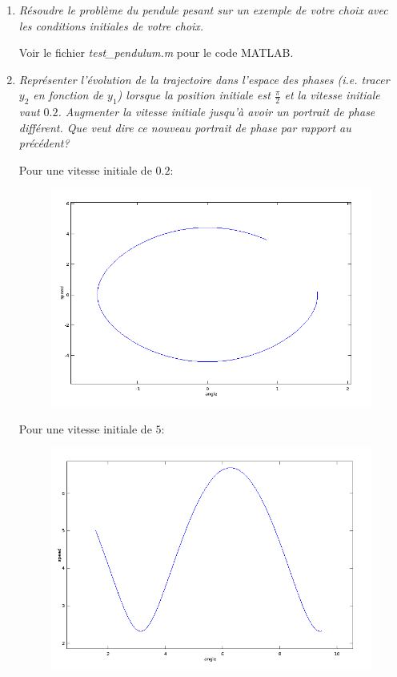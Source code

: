 \documentclass[a4paper,10pt]{article}
\begin{document}
\begin{enumerate}
    \item \emph{Résoudre le problème du pendule pesant sur un exemple de votre choix
    avec les conditions initiales de votre choix.}

    Voir le fichier \emph{test\_pendulum.m} pour le code MATLAB.

    \item \emph{Représenter l'évolution de la trajectoire dans l'espace des phases (i.e.
    tracer $y_2$ en fonction de $y_1$) lorsque la position initiale est
    $\frac{\pi}{2}$ et la vitesse initiale vaut $0.2$. Augmenter la vitesse initiale
    jusqu'à avoir un portrait de phase différent. Que veut dire ce nouveau portrait
    de phase par rapport au précédent?}

    Pour une vitesse initiale de $0.2$:
\begin{figure}[h!]
    \centering
    \includegraphics[scale=0.5]{./img/pendulum-phase1.png}
\end{figure}
\clearpage
    Pour une vitesse initiale de $5$:
\begin{figure}[h!]
    \centering
    \includegraphics[scale=0.5]{./img/pendulum-phase.png}
\end{figure}


\end{enumerate}
\end{document}
